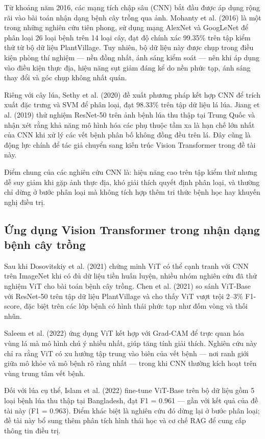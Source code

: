 Từ khoảng năm 2016, các mạng tích chập sâu (CNN) bắt đầu được áp dụng rộng rãi vào bài toán nhận dạng bệnh cây trồng qua ảnh. Mohanty et al. (2016) \cite{mohanty2016} là một trong những nghiên cứu tiên phong, sử dụng mạng AlexNet và GoogLeNet để phân loại 26 loại bệnh trên 14 loại cây, đạt độ chính xác 99.35\% trên tập kiểm thử từ bộ dữ liệu PlantVillage. Tuy nhiên, bộ dữ liệu này được chụp trong điều kiện phòng thí nghiệm --- nền đồng nhất, ánh sáng kiểm soát --- nên khi áp dụng vào điều kiện thực địa, hiệu năng sụt giảm đáng kể do nền phức tạp, ánh sáng thay đổi và góc chụp không nhất quán.

Riêng với cây lúa, Sethy et al. (2020) \cite{sethy2020} đề xuất phương pháp kết hợp CNN để trích xuất đặc trưng và SVM để phân loại, đạt 98.33\% trên tập dữ liệu lá lúa. Jiang et al. (2019) \cite{jiang2019} thử nghiệm ResNet-50 trên ảnh bệnh lúa thu thập tại Trung Quốc và nhận xét rằng khả năng mô hình hóa các phụ thuộc tầm xa là hạn chế lớn nhất của CNN khi xử lý các vết bệnh phân bố không đồng đều trên lá. Đây cũng là động lực chính để tác giả chuyển sang kiến trúc Vision Transformer trong đề tài này.

Điểm chung của các nghiên cứu CNN là: hiệu năng cao trên tập kiểm thử nhưng dễ suy giảm khi gặp ảnh thực địa, khó giải thích quyết định phân loại, và thường chỉ dừng ở bước phân loại mà không tích hợp thêm tri thức bệnh học hay khuyến nghị điều trị.
\newpage
\subsection{Ứng dụng Vision Transformer trong nhận dạng bệnh cây trồng}

Sau khi Dosovitskiy et al. (2021) \cite{dosovitskiy2020} chứng minh ViT có thể cạnh tranh với CNN trên ImageNet khi có đủ dữ liệu tiền huấn luyện, nhiều nhóm nghiên cứu đã thử nghiệm ViT cho bài toán bệnh cây trồng. Chen et al. (2021) \cite{chen2021} so sánh ViT-Base với ResNet-50 trên tập dữ liệu PlantVillage và cho thấy ViT vượt trội 2--3\% F1-score, đặc biệt trên các lớp bệnh có hình thái phức tạp như đốm vòng và thối nhũn.

Saleem et al. (2022) \cite{saleem2022} ứng dụng ViT kết hợp với Grad-CAM để trực quan hóa vùng lá mà mô hình chú ý nhiều nhất, giúp tăng tính giải thích. Nghiên cứu này chỉ ra rằng ViT có xu hướng tập trung vào biên của vết bệnh --- nơi ranh giới giữa mô khỏe và mô bệnh rõ ràng nhất --- trong khi CNN thường kích hoạt trên vùng trung tâm vết bệnh.

Đối với lúa cụ thể, Islam et al. (2022) \cite{islam2022} fine-tune ViT-Base trên bộ dữ liệu gồm 5 loại bệnh lúa thu thập tại Bangladesh, đạt F1 = 0.961 --- gần với kết quả của đề tài này (F1 = 0.963). Điểm khác biệt là nghiên cứu đó dừng lại ở bước phân loại; đề tài này bổ sung thêm phân tích hình thái học và cơ chế RAG để cung cấp thông tin điều trị.

